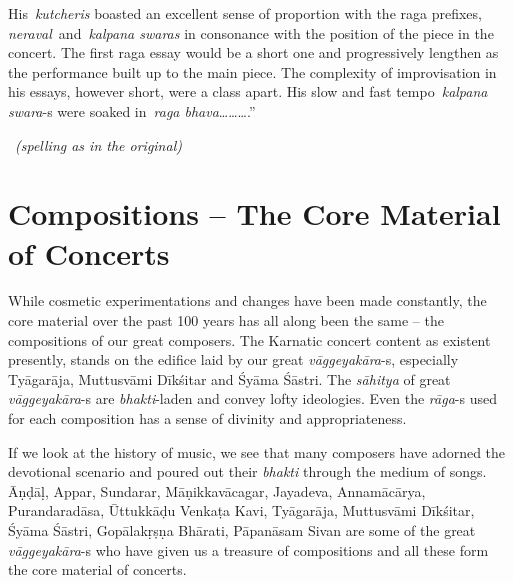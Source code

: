 \begin{myquote}
His \textit{kutcheris} boasted an excellent sense of proportion with the raga prefixes, \textit{neraval} and \textit{kalpana swaras} in consonance with the position of the piece in the concert. The first raga essay would be a short one and progressively lengthen as the performance built up to the main piece. The complexity of improvisation in his essays, however short, were a class apart. His slow and fast tempo \textit{kalpana swara}-s were soaked in \textit{raga bhava}……….” 

~\hfill \textit{(spelling as in the original)}
\end{myquote}


\section*{Compositions – The Core Material of Concerts}

While cosmetic experimentations and changes have been made constantly, the core material over the past 100 years has all along been the same – the compositions of our great composers. The Karnatic concert content as existent presently, stands on the edifice laid by our great \textit{vāggeyakāra}-s, especially Tyāgarāja, Muttusvāmi Dīkśitar and Śyāma Śāstri. The \textit{sāhitya} of great \textit{vāggeyakāra}-s are \textit{bhakti}-laden and convey lofty ideologies. Even the \textit{rāga}-s used for each composition has a sense of divinity and appropriateness.

If we look at the history of music, we see that many composers have adorned the devotional scenario and poured out their \textit{bhakti} through the medium of songs. Āṇḍāḷ, Appar, Sundarar, Māṇikkavācagar, Jayadeva, Annamācārya, Purandaradāsa, Ūttukkāḍu Venkaṭa Kavi, Tyāgarāja, Muttusvāmi Dīkśitar, Śyāma Śāstri, Gopālakṛṣṇa Bhārati, Pāpanāsam Sivan are some of the great \textit{vāggeyakāra}-s who have given us a treasure of compositions and all these form the core material of concerts.

